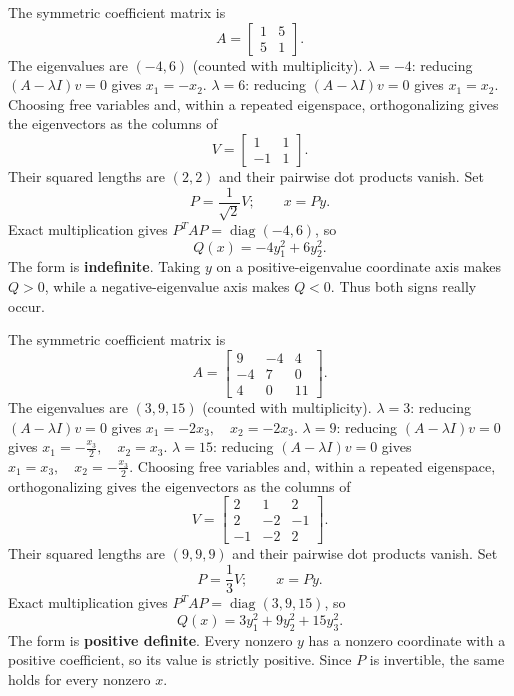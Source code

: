 The symmetric coefficient matrix is
\[
 A=\begin{bmatrix}1&5\\5&1\end{bmatrix}.
\]
The eigenvalues are $(-4,6)$ (counted with multiplicity).
$\lambda=-4$: reducing $(A-\lambda I)v=0$ gives
\( x_{1}=- x_{2} \).
$\lambda=6$: reducing $(A-\lambda I)v=0$ gives
\( x_{1}=x_{2} \).
Choosing free variables and, within a repeated eigenspace, orthogonalizing
gives the eigenvectors as the columns of
\[
 V=\begin{bmatrix}1&1\\-1&1\end{bmatrix}.
\]
Their squared lengths are $(2,2)$ and their pairwise dot products vanish. Set
\[
 P=\frac1{\sqrt{2}}V;\qquad x=Py.
\]
Exact multiplication gives $P^TAP=\operatorname{diag}(-4,6)$, so
\[
 Q(x)=\boxed{- 4 y_{1}^{2} + 6 y_{2}^{2}}.
\]
The form is \textbf{indefinite}. Taking $y$ on a positive-eigenvalue coordinate axis makes $Q>0$,
while a negative-eigenvalue axis makes $Q<0$. Thus both signs really occur.

The symmetric coefficient matrix is
\[
 A=\begin{bmatrix}9&-4&4\\-4&7&0\\4&0&11\end{bmatrix}.
\]
The eigenvalues are $(3,9,15)$ (counted with multiplicity).
$\lambda=3$: reducing $(A-\lambda I)v=0$ gives
\( x_{1}=- 2 x_{3},\quad x_{2}=- 2 x_{3} \).
$\lambda=9$: reducing $(A-\lambda I)v=0$ gives
\( x_{1}=- \frac{x_{3}}{2},\quad x_{2}=x_{3} \).
$\lambda=15$: reducing $(A-\lambda I)v=0$ gives
\( x_{1}=x_{3},\quad x_{2}=- \frac{x_{3}}{2} \).
Choosing free variables and, within a repeated eigenspace, orthogonalizing
gives the eigenvectors as the columns of
\[
 V=\begin{bmatrix}2&1&2\\2&-2&-1\\-1&-2&2\end{bmatrix}.
\]
Their squared lengths are $(9,9,9)$ and their pairwise dot products vanish. Set
\[
 P=\frac1{3}V;\qquad x=Py.
\]
Exact multiplication gives $P^TAP=\operatorname{diag}(3,9,15)$, so
\[
 Q(x)=\boxed{3 y_{1}^{2} + 9 y_{2}^{2} + 15 y_{3}^{2}}.
\]
The form is \textbf{positive definite}. Every nonzero $y$ has a nonzero coordinate with a positive coefficient,
so its value is strictly positive. Since $P$ is invertible, the same holds
for every nonzero $x$.

